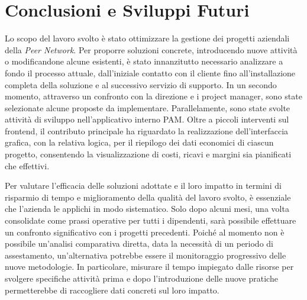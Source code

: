 \chapter{Conclusioni e Sviluppi Futuri}


Lo scopo del lavoro svolto è stato ottimizzare la gestione dei progetti aziendali della \textit{Peer Network}.
Per proporre soluzioni concrete, introducendo nuove attività o modificandone alcune esistenti, è stato
innanzitutto necessario analizzare a fondo il processo attuale, dall’iniziale contatto con il cliente
fino all’installazione completa della soluzione e al successivo servizio di supporto. In un secondo momento,
attraverso un confronto con la direzione e i project manager, sono state selezionate alcune proposte
da implementare. Parallelamente, sono state svolte attività di sviluppo nell’applicativo interno \ac{PAM}.
Oltre a piccoli interventi sul frontend, il contributo principale ha riguardato la realizzazione
dell’interfaccia grafica, con la relativa logica, per il riepilogo dei dati economici di ciascun
progetto, consentendo la visualizzazione di costi, ricavi e margini sia pianificati che effettivi.

Per valutare l’efficacia delle soluzioni adottate e il loro impatto in termini di risparmio
di tempo e miglioramento della qualità del lavoro svolto, è essenziale che l’azienda le applichi in
modo sistematico. Solo dopo alcuni mesi, una volta consolidate come prassi operative per tutti i dipendenti,
sarà possibile effettuare un confronto significativo con i progetti precedenti.
Poiché al momento non è possibile un’analisi comparativa diretta, data la necessità di un periodo di
assestamento, un’alternativa potrebbe essere il monitoraggio progressivo delle nuove metodologie.
In particolare, misurare il tempo impiegato dalle risorse per svolgere specifiche attività prima e
dopo l’introduzione delle nuove pratiche permetterebbe di raccogliere dati concreti sul loro impatto.

